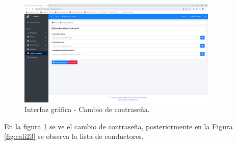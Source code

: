 	\begin{figure}[!h] %
		\caption[Interfaz gráfica - Cambio de contraseña]
		{\newline Interfaz gráfica - Cambio de contraseña.} %
		\centering
		\includegraphics[width=0.85\textwidth]{imagenes/cap_3/Img_calibus/CALIBUS09.png} %
		
		\begin{flushleft}
		\end{flushleft}
		\vspace{-16pt}
		\label{fig:cali09} %
	\end{figure}
	
	\vspace{-0.6cm} %
	
	En la figura \ref{fig:cali09} se ve el cambio de contraseña, posteriormente en la Figura \ref{fig:cali23} se observa la lista de conductores.
	
	\vspace{0.3cm} %
	
